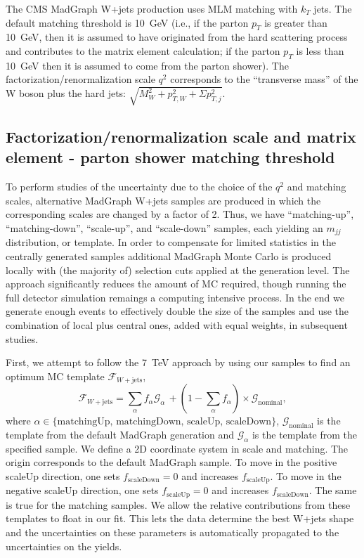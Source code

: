 The CMS MadGraph W+jets production uses MLM matching
\cite{Hoche:2006ph} with $k_T$ jets.  The default matching threshold
is 10~GeV (i.e., if the parton $p_{T}$ is greater than 10~GeV, then it
is assumed to have originated from the hard scattering process and
contributes to the matrix element calculation; if the parton $p_{T}$
is less than 10~GeV then it is assumed to come from the parton
shower).  The factorization/renormalization scale $q^2$ corresponds to
the ``transverse mass'' of the W boson plus the hard jets: $\sqrt{M_W^2 + p_{T, W}^2 + \Sigma p_{T,j}^2}$.

\subsection{Factorization/renormalization scale and matrix element - parton shower matching threshold}
\label{sec:wjetsShapeMatchingQ2}

To perform studies of the uncertainty due to the choice of the $q^2$
and matching scales, alternative MadGraph W+jets samples are produced
in which the corresponding scales are changed by a factor of 2. Thus,
we have ``matching-up'', ``matching-down'', ``scale-up'', and
``scale-down'' samples, each yielding an $m_{jj}$ distribution, or
template. In order to compensate for limited statistics in the centrally generated samples
additional MadGraph Monte Carlo is produced locally with (the majority of) selection cuts applied at the generation level.
The approach significantly reduces the amount of MC required, though running the full detector simulation remaings a computing intensive process. In the end we generate enough events to effectively double the size of the samples and use the combination of local plus central ones, added with equal weights, in subsequent studies.

First, we attempt to follow the 7~TeV approach by using our samples to find an optimum MC template
$\mathcal{F}_{W+\text{jets}}$,
\begin{equation}
\mathcal{F}_{W+\text{jets}} = \sum_\alpha f_\alpha \mathcal{G}_\alpha\, + (1-\sum_\alpha f_\alpha)\times\mathcal{G}_\text{nominal},
\label{eqn:wjetsShapeMatchingQ2}
\end{equation}
where $\alpha \in
\{\text{matchingUp,~matchingDown,~scaleUp,~scaleDown}\}$,
$\mathcal{G}_\text{nominal}$ is the template from the default MadGraph
generation and $\mathcal{G}_\alpha$ is the template from the specified
sample.  We define a 2D coordinate system in scale and matching.  The
origin corresponds to the default MadGraph sample.  To move in the
positive scaleUp direction, one sets $f_\text{scaleDown}=0$ and
increases $f_\text{scaleUp}$. To move in the negative scaleUp
direction, one sets $f_\text{scaleUp}=0$ and increases
$f_\text{scaleDown}$.  The same is true for the matching samples.  We
allow the relative contributions from these templates to float in our
fit.  This lets the data determine the best W+jets shape and the
uncertainties on these parameters is automatically propagated to the
uncertainties on the yields.


